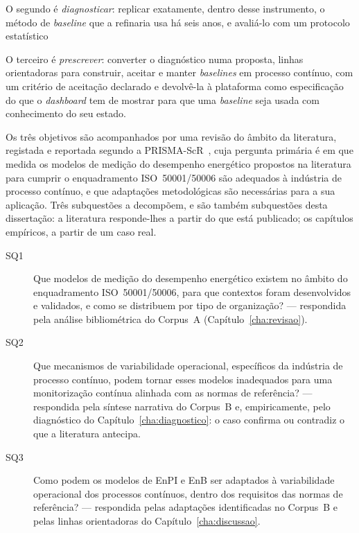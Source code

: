 O segundo é \emph{diagnosticar}: replicar exatamente, dentro desse
instrumento, o método de \emph{baseline} que a refinaria usa há seis
anos, e avaliá-lo com um protocolo estatístico  

O terceiro é \emph{prescrever}: converter o diagnóstico numa proposta,
linhas orientadoras para construir, aceitar e manter \emph{baselines}
em processo contínuo, com um critério de aceitação declarado
 e devolvê-la à plataforma
como especificação do que o \emph{dashboard} tem de mostrar para que uma
\emph{baseline} seja usada com conhecimento do seu estado.

Os três objetivos são acompanhados por uma revisão do
âmbito da literatura, registada e reportada segundo a
PRISMA-ScR~\cite{Tricco2018}, cuja pergunta primária é em que medida os
modelos de medição do desempenho energético propostos na literatura para
cumprir o enquadramento ISO~50001/50006 são adequados à indústria de
processo contínuo, e que adaptações metodológicas são necessárias para a
sua aplicação. Três subquestões a decompõem, e são também subquestões
desta dissertação: a literatura responde-lhes a partir do que está
publicado; os capítulos empíricos, a partir de um caso real.

\begin{description}
  \item[SQ1] Que modelos de medição do desempenho energético existem no
    âmbito do enquadramento ISO~50001/50006, para que contextos foram
    desenvolvidos e validados, e como se distribuem por tipo de
    organização? --- respondida pela análise bibliométrica do Corpus~A
    (Capítulo~\ref{cha:revisao}).
  \item[SQ2] Que mecanismos de variabilidade operacional, específicos da
    indústria de processo contínuo, podem tornar esses modelos
    inadequados para uma monitorização contínua alinhada com as normas
    de referência? --- respondida pela síntese narrativa do Corpus~B e,
    empiricamente, pelo diagnóstico do Capítulo~\ref{cha:diagnostico}: o
    caso confirma ou contradiz o que a literatura antecipa.
  \item[SQ3] Como podem os modelos de EnPI e EnB ser adaptados à
    variabilidade operacional dos processos contínuos, dentro dos
    requisitos das normas de referência? --- respondida pelas
    adaptações identificadas no Corpus~B e pelas linhas orientadoras do
    Capítulo~\ref{cha:discussao}.
\end{description}

